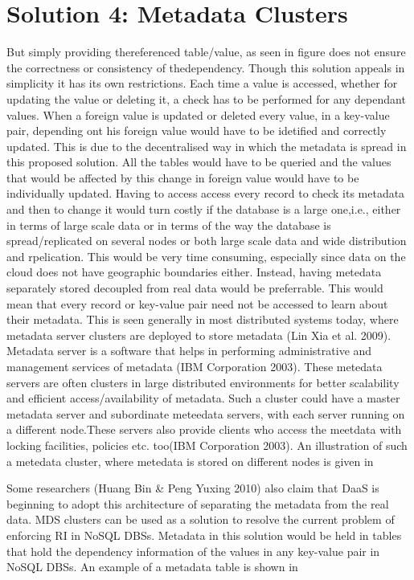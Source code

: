 \section{Solution 4:  Metadata Clusters}\label{s:sol4}
But simply providing thereferenced table/value, as seen in figure does not
ensure the correctness or consistency of thedependency. Though this solution
appeals in simplicity it has its own restrictions. Each time a value is
accessed, whether for updating the value or deleting it, a check has to be
performed for any dependant values. When a foreign value is updated or deleted
every value, in a key-value pair, depending ont his foreign value would have to
be idetified and correctly updated. This is due to the decentralised way in
which the metadata is spread in this proposed solution. All the tables would have to
be queried and the values that would be affected by this change in foreign value
would have to be individually updated.  Having to access access every record to
check its metadata and then to change it would turn costly if the database is a
large one,i.e., either in terms of large scale data or in terms of the way the
database is spread/replicated on several nodes or both large scale data and wide
distribution and rpelication. This would be very time consuming, especially
since data on the cloud does not have geographic boundaries either.
Instead, having metedata separately stored decoupled from real data would be
preferrable. This would mean that every record or key-value pair need not be
accessed to learn about their metadata. This is seen generally in most
distributed systems today, where metadata server clusters are deployed to store
metadata (Lin Xia et al. 2009). Metadata server is a software that helps in
performing administrative and management services of metadata (IBM Corporation
2003). These metedata servers are often clusters in large distributed
environments for better scalability and efficient access/availability of
metadata. Such a cluster could have a master metadata server and subordinate
meteedata servers, with each server running on a different node.These servers
also provide clients who access the meetdata with locking facilities, policies
etc. too(IBM Corporation 2003). An illustration of such a metedata cluster,
where metedata is stored on different nodes is given in

Some researchers (Huang Bin \& Peng Yuxing 2010) also claim that DaaS is
beginning to adopt this architecture of separating the metadata from the real
data. MDS clusters can be used as a solution to resolve the current problem of
enforcing RI in NoSQL DBSs. Metadata in this solution would be held in tables
that hold the dependency information of the values in any key-value pair in
NoSQL  DBSs.  An example of a metadata table is shown in

